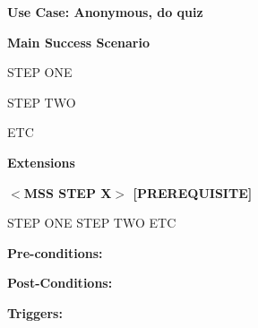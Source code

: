 
\textbf{Use Case: Anonymous, do quiz}

\vspace{8 pt}

\textbf{Main Success Scenario}
\begin{enumerate*}
\setlength{\itemindent}{70pt}

\item STEP ONE
\item STEP TWO
\item ETC
\end{enumerate*}

\vspace{4 pt}

\textbf{Extensions}


\textbf{$<$MSS STEP X$>$  [PREREQUISITE]}
\begin{enumerate*}
\setlength{\itemindent}{70pt}
\itemdot STEP ONE
\itemdot STEP TWO
\itemdot ETC
\end{enumerate*}

\vspace{4 pt}

\textbf{Pre-conditions:}

\textbf{Post-Conditions:}

\textbf{Triggers:}